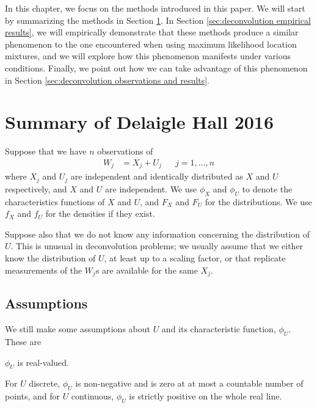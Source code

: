 
	In this chapter, we focus on the methods introduced in this paper. We will start by summarizing the methods in Section \ref{sec:summary of delaigle hall}. In Section \ref{sec:deconvolution empirical results}, we will empirically demonstrate that these methods produce a similar phenomenon to the one encountered when using maximum likelihood location mixtures, and we will explore how this phenomenon manifests under various conditions. Finally, we point out how we can take advantage of this phenomenon in Section \ref{sec:deconvolution observations and results}.


\section{Summary of Delaigle Hall 2016}
\label{sec:summary of delaigle hall}
	Suppose that we have $n$ observations of
	\begin{align}
		W_j &= X_j + U_j &&j = 1, \dots, n
	\end{align}
	where $X_j$ and $U_j$ are independent and identically distributed as $X$ and $U$ respectively, and $X$ and $U$ are independent. We use $\phi_X$ and $\phi_U$ to denote the characteristics functions of $X$ and $U$, and $F_X$ and $F_U$ for the distributions. We use $f_X$ and $f_U$ for the densities if they exist.

	Suppose also that we do not know any information concerning the distribution of $U$. This is unusual in deconvolution problems; we usually assume that we either know the distribution of $U$, at least up to a scaling factor, or that replicate measurements of the $W_j$s are available for the same $X_j$. 

	\subsection{Assumptions}
	We still make some assumptions about $U$ and its characteristic function, $\phi_U$. These are 
	\begin{assumption}
	\label{assump:phiU real}
		$\phi_U$ is real-valued.
	\end{assumption}
	\begin{assumption}
	\label{assump:phiU non zero}
		For $U$ discrete, $\phi_U$ is non-negative and is zero at at most a countable number of points, and for $U$ continuous, $\phi_U$ is strictly positive on the whole real line.
	\end{assumption}

